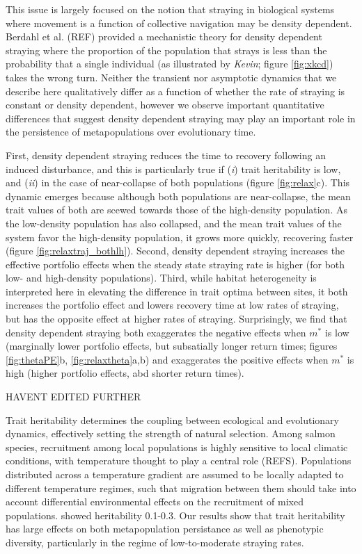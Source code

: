 \documentclass[twocolumn,preprintnumbers,amsmath,amssymb,superscriptaddress]{revtex4}
\begin{document}
This issue is largely focused on the notion that straying in biological systems where movement is a function of collective navigation may be density dependent.
Berdahl et al. (REF) provided a mechanistic theory for density dependent straying where the proportion of the population that strays is less than the probability that a single individual (as illustrated by \emph{Kevin}; figure \ref{fig:xkcd}) takes the wrong turn.
Neither the transient nor asymptotic dynamics that we describe here qualitatively differ as a function of whether the rate of straying is constant or density dependent, however we observe important quantitative differences that suggest density dependent straying may play an important role in the persistence of metapopulations over evolutionary time.

First, density dependent straying reduces the time to recovery following an induced disturbance, and this is particularly true if (\emph{i}) trait heritability is low, and (\emph{ii}) in the case of near-collapse of both populations (figure \ref{fig:relax}c).
This dynamic emerges because although both populations are near-collapse, the mean trait values of both are scewed towards those of the high-density population.
As the low-density population has also collapsed, and the mean trait values of the system favor the high-density population, it grows more quickly, recovering faster (figure \ref{fig:relaxtraj_bothlh}).
Second, density dependent straying increases the effective portfolio effects when the steady state straying rate is higher (for both low- and high-density populations).
Third, while habitat heterogeneity is interpreted here in elevating the difference in trait optima between sites, it both increases the portfolio effect and lowers recovery time at low rates of straying, but has the opposite effect at higher rates of straying.
Surprisingly, we find that density dependent straying both exaggerates the negative effects when $m^*$ is low (marginally lower portfolio effects, but subsatially longer return times; figures \ref{fig:thetaPE}b, \ref{fig:relaxtheta}a,b) and exaggerates the positive effects when $m^*$ is high (higher portfolio effects, abd shorter return times). 

HAVENT EDITED FURTHER

Trait heritability determines the coupling between ecological and evolutionary dynamics, effectively setting the strength of natural selection.
Among salmon species, recruitment among local populations is highly sensitive to local climatic conditions, with temperature thought to play a central role (REFS).
Populations distributed across a temperature gradient are assumed to be locally adapted to different temperature regimes, such that migration between them should take into account differential environmental effects on the recruitment of mixed populations.
\citeauthor{Carlson:2008hl} showed heritability 0.1-0.3.
Our results show that trait heritability has large effects on both metapopulation persistance as well as phenotypic diversity, particularly in the regime of low-to-moderate straying rates.
\end{document}
